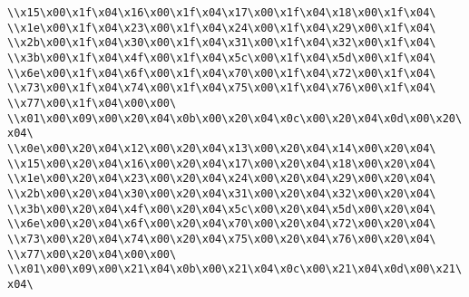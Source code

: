 \verb|\\x15\x00\x1f\x04\x16\x00\x1f\x04\x17\x00\x1f\x04\x18\x00\x1f\x04\|\newline
\verb|\\x1e\x00\x1f\x04\x23\x00\x1f\x04\x24\x00\x1f\x04\x29\x00\x1f\x04\|\newline
\verb|\\x2b\x00\x1f\x04\x30\x00\x1f\x04\x31\x00\x1f\x04\x32\x00\x1f\x04\|\newline
\verb|\\x3b\x00\x1f\x04\x4f\x00\x1f\x04\x5c\x00\x1f\x04\x5d\x00\x1f\x04\|\newline
\verb|\\x6e\x00\x1f\x04\x6f\x00\x1f\x04\x70\x00\x1f\x04\x72\x00\x1f\x04\|\newline
\verb|\\x73\x00\x1f\x04\x74\x00\x1f\x04\x75\x00\x1f\x04\x76\x00\x1f\x04\|\newline
\verb|\\x77\x00\x1f\x04\x00\x00\|\newline
\verb|\\x01\x00\x09\x00\x20\x04\x0b\x00\x20\x04\x0c\x00\x20\x04\x0d\x00\x20\x04\|\newline
\verb|\\x0e\x00\x20\x04\x12\x00\x20\x04\x13\x00\x20\x04\x14\x00\x20\x04\|\newline
\verb|\\x15\x00\x20\x04\x16\x00\x20\x04\x17\x00\x20\x04\x18\x00\x20\x04\|\newline
\verb|\\x1e\x00\x20\x04\x23\x00\x20\x04\x24\x00\x20\x04\x29\x00\x20\x04\|\newline
\verb|\\x2b\x00\x20\x04\x30\x00\x20\x04\x31\x00\x20\x04\x32\x00\x20\x04\|\newline
\verb|\\x3b\x00\x20\x04\x4f\x00\x20\x04\x5c\x00\x20\x04\x5d\x00\x20\x04\|\newline
\verb|\\x6e\x00\x20\x04\x6f\x00\x20\x04\x70\x00\x20\x04\x72\x00\x20\x04\|\newline
\verb|\\x73\x00\x20\x04\x74\x00\x20\x04\x75\x00\x20\x04\x76\x00\x20\x04\|\newline
\verb|\\x77\x00\x20\x04\x00\x00\|\newline
\verb|\\x01\x00\x09\x00\x21\x04\x0b\x00\x21\x04\x0c\x00\x21\x04\x0d\x00\x21\x04\|\newline

